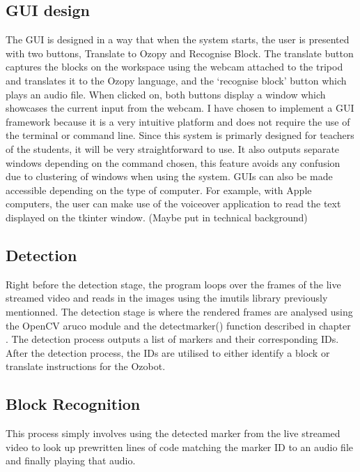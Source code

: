 \documentclass[oneside,%
                    author={Malak Hajji},
                    degree={BSc},
                    title={Designing An Accessible Computational Toolkit For Students},
                  subtitle={With Mixed Visual Abilities}]{dissertation}
\begin{document}
\subsection{GUI design} 
 
The GUI is designed in a way that when the system starts, the user is presented with two buttons, Translate to Ozopy and Recognise Block. The translate button captures the blocks on the workspace using the webcam attached to the tripod and translates it to the Ozopy language, and the ‘recognise block’ button which plays an audio file. When clicked on, both buttons display a window which showcases the current input from the webcam.  
I have chosen to implement a GUI framework because it is a very intuitive platform and does not require the use of the terminal or command line. Since this system is primarly designed for teachers of the students, it will be very straightforward to use. It also outputs separate windows depending on the command chosen, this feature avoids any confusion due to clustering of windows when using the system.  
GUIs can also be made accessible depending on the type of computer. For example, with Apple computers, the user can make use of the voiceover application to read the text displayed on the tkinter window. (Maybe put in technical background) 
  
\subsection{Detection} 
 
Right before the detection stage, the program loops over the frames of the live streamed video and reads in the images using the imutils library previously mentionned. The detection stage is where the rendered frames are analysed using the OpenCV aruco module and the detectmarker() function described in chapter . 
The detection process outputs a list of markers and their corresponding IDs. 
After the detection process, the IDs are utilised to either identify a block or translate instructions for the Ozobot. 
 
\subsection{Block Recognition}
 
This process simply involves using the detected marker from the live streamed video to look up prewritten lines of code matching the marker ID to an audio file and finally playing that audio. 
 
\end{document}
